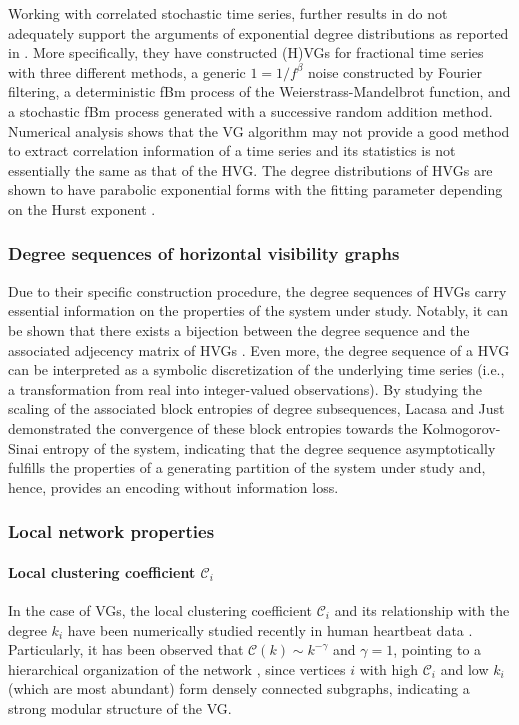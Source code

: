 		Working with correlated stochastic time series, further results in \cite{Manshour2015} do not adequately support the arguments of exponential degree distributions as reported in \cite{Lacasa2010}. More specifically, they have constructed (H)VGs for fractional time series with three different methods, a generic $1 = 1 / f^{\beta}$ noise constructed by Fourier filtering, a deterministic fBm process of the Weierstrass-Mandelbrot function, and a stochastic fBm process generated with a successive random addition method. Numerical analysis shows that the VG algorithm may not provide a good method to extract correlation information of a time series and its statistics is not essentially the same as that of the HVG. The degree distributions of HVGs are shown to have parabolic exponential forms with the fitting parameter depending on the Hurst exponent \cite{Manshour2015}. 
		
        \subsubsection{Degree sequences of horizontal visibility graphs}
        
        Due to their specific construction procedure, the degree sequences of HVGs carry essential information on the properties of the system under study. Notably, it can be shown that there exists a bijection between the degree sequence and the associated adjecency matrix of HVGs \cite{Luque2017b}. Even more, the degree sequence of a HVG can be interpreted as a symbolic discretization of the underlying time series (i.e., a transformation from real into integer-valued observations). By studying the scaling of the associated block entropies of degree subsequences, Lacasa and Just \cite{Lacasa2018} demonstrated the convergence of these block entropies towards the Kolmogorov-Sinai entropy of the system, indicating that the degree sequence asymptotically fulfills the properties of a generating partition of the system under study and, hence, provides an encoding without information loss.
        
        
		\subsubsection{Local network properties}
		\paragraph{Local clustering coefficient $\mathcal{C}_i$} 
		In the case of VGs, the local clustering coefficient $\mathcal{C}_i$ and its relationship with the degree $k_i$ have been numerically studied recently in human heartbeat data \cite{Shao2010}. Particularly, it has been observed that $\mathcal{C}(k) \sim k^{-\gamma}$ and $\gamma = 1$, pointing to a hierarchical organization of the network \cite{Albert2002}, since vertices $i$ with high $\mathcal{C}_i$ and low $k_i$ (which are most abundant) form densely connected subgraphs, indicating a strong modular structure of the VG. 

